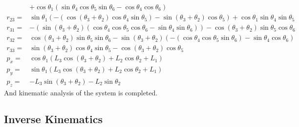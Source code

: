 \documentclass{article}
\begin{document}
\[\begin{aligned}
        & +\cos\theta_1 \left( \sin\theta_4 \cos\theta_5 \sin\theta_6-\cos\theta_4 \cos\theta_6\right) \\
        r_{23} = & \sin\theta_1 \left( -\left( \cos{\left( {{\theta }_3}+{{\theta }_2}\right) } \cos\theta_4 \sin\theta_5\right) -\sin{\left( {{\theta }_3}+{{\theta }_2}\right) } \cos\theta_5\right) +\cos\theta_1 \sin\theta_4 \sin\theta_5 \\
        r_{31} = &  -\left( \sin{\left( {{\theta }_3}+{{\theta }_2}\right) } \left( \cos\theta_4 \cos\theta_5 \cos\theta_6-\sin\theta_4 \sin\theta_6\right) \right) -\cos{\left( {{\theta }_3}+{{\theta }_2}\right) } \sin\theta_5 \cos\theta_6 \\
        r_{32} = & \cos{\left( {{\theta }_3}+{{\theta }_2}\right) } \sin\theta_5 \sin\theta_6-\sin{\left( {{\theta }_3}+{{\theta }_2}\right) } \left( -\left( \cos\theta_4 \cos\theta_5 \sin\theta_6\right) -\sin\theta_4 \cos\theta_6\right) \\
        r_{33} = & \sin{\left( {{\theta }_3}+{{\theta }_2}\right) } \cos\theta_4 \sin\theta_5-\cos{\left( {{\theta }_3}+{{\theta }_2}\right) } \cos\theta_5 \\
        p_x = & \cos{\theta_1} \left( {L_3} \cos{\left( {{\theta }_3}+{{\theta }_2}\right) }+{L_2} \cos{\theta_2}+{L_1}\right) \\
        p_y = & \sin{\theta_1} \left( {L_3} \cos{\left( {{\theta }_3}+{{\theta }_2}\right) }+{L_2} \cos{\theta_2}+{L_1}\right)  \\
        p_z = & -{L_3} \sin{\left( {{\theta }_3}+{{\theta }_2}\right) } -{L_2} \sin{\theta_2}
    \end{aligned}
\]
And kinematic analysis of the system is completed.

\subsection{Inverse Kinematics}
\end{document}
